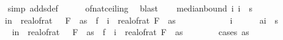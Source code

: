 \begin{isabellebody}
\ \ \ \ \isamarkupfalse%
\ {\isacharparenleft}{\kern0pt}simp\ add{\isacharcolon}{\kern0pt}sdef{\isacharparenright}{\kern0pt}\isanewline
\ \ \ \ \isamarkupfalse%
\ of{\isacharunderscore}{\kern0pt}nat{\isacharunderscore}{\kern0pt}ceiling\ \isamarkupfalse%
\ blast\isanewline
\isanewline
\ \ \isamarkupfalse%
\ median{\isacharunderscore}{\kern0pt}bound{\isacharunderscore}{\kern0pt}{}{\isacharcolon}{\kern0pt}\ {\isachardoublequoteopen}{\isasymAnd}i{\isachardot}{\kern0pt}\ i\ {\isacharless}{\kern0pt}\ s\ {\isasymLongrightarrow}\isanewline
\ \ \ \ {\isasymP}{\isacharparenleft}{\kern0pt}{\isasymomega}\ in\ {\isasymOmega}\ real{\isacharunderscore}{\kern0pt}of{\isacharunderscore}{\kern0pt}rat\ {\isacharparenleft}{\kern0pt}{\isasymdelta}\ {\isacharasterisk}{\kern0pt}\ F\ {}\ as{\isacharparenright}{\kern0pt}\ {\isacharless}{\kern0pt}\ {\isasymbar}f{}\ {\isasymomega}\ i\ {\isacharminus}{\kern0pt}\ real{\isacharunderscore}{\kern0pt}of{\isacharunderscore}{\kern0pt}rat\ {\isacharparenleft}{\kern0pt}F\ {}\ as{\isacharparenright}{\kern0pt}{\isasymbar}{\isacharparenright}{\kern0pt}\ {\isasymle}\ {}{\isacharslash}{\kern0pt}{}{\isachardoublequoteclose}\isanewline
\ \ \isamarkupfalse%
\ {\isacharminus}{\kern0pt}\isanewline
\ \ \ \ \isamarkupfalse%
\ i\isanewline
\ \ \ \ \isamarkupfalse%
\ a{\isacharcolon}{\kern0pt}{\isachardoublequoteopen}i\ {\isacharless}{\kern0pt}\ s\isanewline
\ \ \ \ \isamarkupfalse%
\ {\isachardoublequoteopen}{\isasymP}{\isacharparenleft}{\kern0pt}{\isasymomega}\ in\ {\isasymOmega}\ real{\isacharunderscore}{\kern0pt}of{\isacharunderscore}{\kern0pt}rat\ {\isacharparenleft}{\kern0pt}{\isasymdelta}\ {\isacharasterisk}{\kern0pt}\ F\ {}\ as{\isacharparenright}{\kern0pt}\ {\isacharless}{\kern0pt}\ {\isasymbar}f{}\ {\isasymomega}\ i\ {\isacharminus}{\kern0pt}\ real{\isacharunderscore}{\kern0pt}of{\isacharunderscore}{\kern0pt}rat\ {\isacharparenleft}{\kern0pt}F\ {}\ as{\isacharparenright}{\kern0pt}{\isasymbar}{\isacharparenright}{\kern0pt}\ {\isasymle}\ {}{\isacharslash}{\kern0pt}{}{\isachardoublequoteclose}\isanewline
\ \ \ \ \isamarkupfalse%
\ {\isacharparenleft}{\kern0pt}cases\ {\isachardoublequoteopen}as\ {\isacharequal}{\kern0pt}\ {\isacharbrackleft}{\kern0pt}{\isacharbrackright}{\kern0pt}{\isachardoublequoteclose}{\isacharparenright}{\kern0pt}\isanewline

\end{isabellebody}
